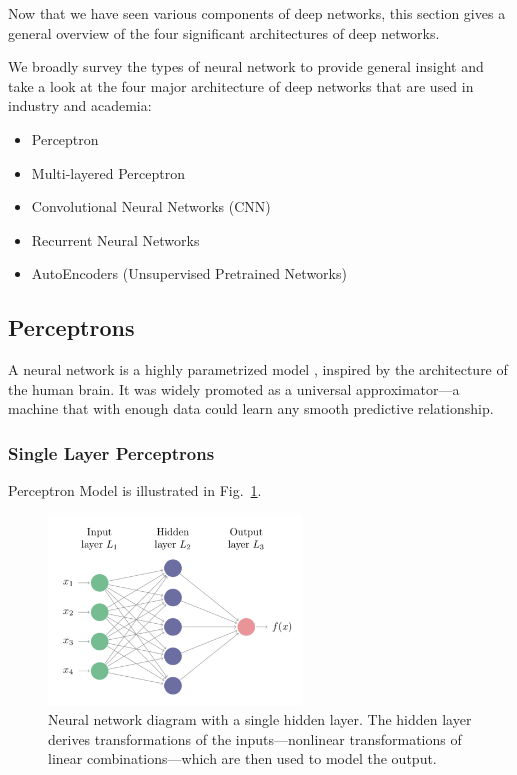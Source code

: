 Now that we have seen various components of deep networks, this section gives a general overview of the four significant architectures of deep networks.

We broadly survey the types of neural network to provide general insight and take a look at the four major architecture of deep networks that are used in industry and academia: 

\begin{itemize}
\item Perceptron
\item  Multi-layered Perceptron
\item Convolutional Neural Networks (CNN)
\item Recurrent Neural Networks
\item AutoEncoders (Unsupervised Pretrained Networks)
\end{itemize}

\subsection{Perceptrons}

A neural network is a highly parametrized model \cite{efron2016computer}, inspired by the architecture of the human brain. It was widely promoted as a universal approximator—a machine that with enough data could learn any smooth predictive relationship.

\subsubsection*{Single Layer Perceptrons}

Perceptron Model is illustrated in Fig.~\ref{fig:perceptron}.
\begin{figure}[htbp]
\centering
\includegraphics[width=0.6\textwidth]{images/perceptron.png}
\caption{Neural network diagram with a single hidden layer. The hidden layer derives transformations of the inputs—nonlinear transformations of linear combinations—which are then used to model the output.}
\label{fig:perceptron}
\end{figure}

